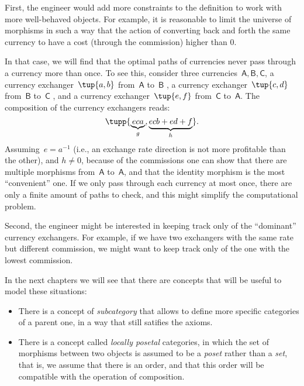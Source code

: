 First, the engineer would add more constraints to the definition to work with more well-behaved objects. For example, it is reasonable to limit the universe of morphisms in such a way that the action of converting back and forth the same currency to have a cost (through the commission) higher than 0.

In that case, we will find that the optimal paths of currencies never pass through a currency more than once. To see this, consider three currencies~$\mathsf{A,B,C}$, a currency exchanger~$\tup{a,b}$ from~$\mathsf{A}$ to~$\mathsf{B}$ , a currency exchanger~$\tup{c,d}$ from~$\mathsf{B}$ to~$\mathsf{C}$ , and a currency exchanger~$\tup{e,f}$ from~$\mathsf{C}$ to~$\mathsf{A}$.
The composition of the currency exchangers reads:
\begin{equation*}
  \tupp{\underbrace{eca}_{g}, \underbrace{ecb+ed+f}_{h}}.
\end{equation*}
Assuming~$e=a^{-1}$ (i.e., an exchange rate direction is not more profitable than the other), and $h\neq 0$, because of the commissions one can show that there are multiple morphisms from~$\mathsf{A}$ to~$\mathsf{A}$, and that the identity morphism is the most ``convenient'' one.
If we only pass through each currency at most once, there are only a finite amount of paths to check, and this might simplify the computational problem.

Second, the engineer might be interested in keeping track only of the ``dominant'' currency exchangers.
For example, if we have two exchangers with the same rate but different commission, we might want to keep track only of the one with the lowest commission.

In the next chapters we will see that there are concepts that will be useful to model these situations:
\begin{itemize}
  \item There is a concept of \emph{subcategory} that allows to define more specific
  categories of a parent one, in a way that still satifies the axioms.
  \item There is a concept called \emph{locally posetal} categories, in which the
  set of morphisms between two objects is assumed to be a \emph{poset} rather than a \emph{set},
  that is, we assume that there is an order, and that this order will be compatible with the operation of composition.
\end{itemize}

